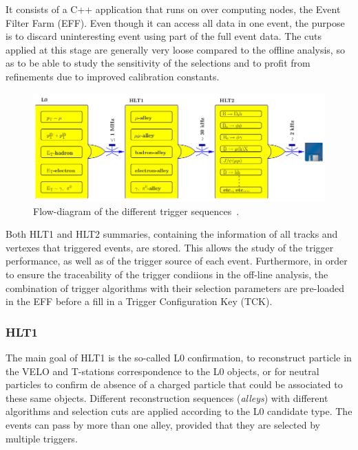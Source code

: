 It consists of a C++ application that runs on over  computing nodes, the Event Filter Farm (EFF). Even though it can access all data in one event, the purpose is to discard uninteresting event using part of the full event data. The cuts applied at this stage are generally very loose compared to the offline analysis, so as to be able to study the sensitivity of the selections and to profit from refinements due to improved calibration constants. 

\begin{figure} [htb!]
\begin{center}
\includegraphics[scale=0.7]{figs/HLT.png}
\caption{Flow-diagram of the different trigger sequences~\cite{Alves:2008zz}.\label{fig:lhcb_HLT}}
\end{center}
\end{figure}

Both HLT1 and HLT2 summaries, containing the information of all tracks and vertexes that triggered events, are stored. This allows the study of the trigger performance, as well as of the trigger source of each event. Furthermore, in order to ensure the traceability of the trigger condiions in the off-line analysis, the combination of trigger algorithms with their selection parameters are pre-loaded in the EFF before a fill in a Trigger Configuration Key (TCK). 

\subsubsection{HLT1} 
\label{sec:HLT1}
The main goal of HLT1 is the so-called L0 confirmation, to reconstruct particle in the VELO and T-stations correspondence to the L0 objects, or for neutral particles to confirm de absence of a charged particle that could be associated to these same objects. Different reconstruction sequences (\textit{alleys}) with different algorithms and selection cuts are applied according to the L0 candidate type. The events can pass by more than one alley, provided that they are selected by multiple triggers. 
